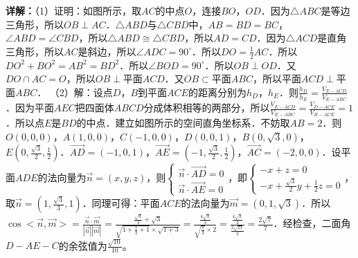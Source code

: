 \begin{question}[points=12]
\begin{solution}
\textbf{详解：}（1）证明：如图所示，取$AC$的中点$O$，连接$BO$，$OD$．因为$\triangle ABC$是等边三角形，所以$OB\perp AC$．$\triangle ABD$与$\triangle CBD$中，$AB=BD=BC$，$\angle ABD=\angle CBD$，所以$\triangle ABD\cong\triangle CBD$，所以$AD=CD$．因为$\triangle ACD$是直角三角形，所以$AC$是斜边，所以$\angle ADC=90^\circ$．所以$DO=\frac{1}{2}AC$．所以$DO^2+BO^2=AB^2=BD^2$．所以$\angle BOD=90^\circ$．所以$OB\perp OD$．又$DO\cap AC=O$，所以$OB\perp$平面$ACD$．又$OB\subset$平面$ABC$，所以平面$ACD\perp$平面$ABC$．
（2）解：设点$D$，$B$到平面$ACE$的距离分别为$h_D$，$h_E$．则$\frac{h_D}{h_E}=\frac{V_{E-ACD}}{V_{E-ABC}}$．因为平面$AEC$把四面体$ABCD$分成体积相等的两部分，所以$\frac{V_{E-ACD}}{V_{E-ABC}}=\frac{V_{D-ACE}}{V_{B-ACE}}=1$．所以点$E$是$BD$的中点．建立如图所示的空间直角坐标系．不妨取$AB=2$．则$O(0,0,0)$，$A(1,0,0)$，$C(-1,0,0)$，$D(0,0,1)$，$B(0,\sqrt{3},0)$，$E(0,\frac{\sqrt{3}}{2},\frac{1}{2})$．$\overrightarrow{AD}=(-1,0,1)$，$\overrightarrow{AE}=(-1,\frac{\sqrt{3}}{2},\frac{1}{2})$，$\overrightarrow{AC}=(-2,0,0)$．设平面$ADE$的法向量为$\overrightarrow{n}=(x,y,z)$，则$\begin{cases} \overrightarrow{n}\cdot\overrightarrow{AD}=0 \\ \overrightarrow{n}\cdot\overrightarrow{AE}=0 \end{cases}$，即$\begin{cases} -x+z=0 \\ -x+\frac{\sqrt{3}}{2}y+\frac{1}{2}z=0 \end{cases}$，取$\overrightarrow{n}=(1,\frac{\sqrt{3}}{3},1)$．同理可得：平面$ACE$的法向量为$\overrightarrow{m}=(0,1,\sqrt{3})$．所以$\cos<\overrightarrow{n},\overrightarrow{m}>=\frac{\overrightarrow{n}\cdot\overrightarrow{m}}{|\overrightarrow{n}||\overrightarrow{m}|}=\frac{\frac{\sqrt{3}}{3}+\sqrt{3}}{\sqrt{1+\frac{1}{3}+1}\times\sqrt{1+3}}=\frac{\frac{4\sqrt{3}}{3}}{\sqrt{\frac{7}{3}}\times2}=\frac{\frac{4\sqrt{3}}{3}}{\frac{2\sqrt{21}}{3}}=\frac{2\sqrt{7}}{7}$．经检查，二面角$D-AE-C$的余弦值为$\frac{\sqrt{10}}{10}$。
\end{solution}
\end{question}


